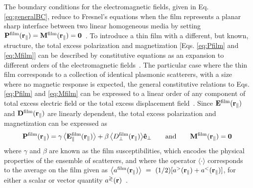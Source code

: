The boundary conditions for the electromagnetic fields, given in Eq. \eqref{eq:generalBC}, reduce to Fresnel’s equations when the film represents a planar sharp interface between two linear homogeneous media by setting $\vb{P}^\text{film}(\vb{r}_\parallel) = \vb{M}^\text{film}(\vb{r}_\parallel) = \vb{0}$~\cite{bedeaux_optical_2004}. To introduce a thin film with a different, but known, structure, the total excess polarization and magnetization [Eqs. \eqref{eq:Pfilm} and \eqref{eq:Mfilm}] can be described by constitutive equations as an expansion to different orders of the electromagnetic fields~\cite{bedeaux_optical_2004}. The particular case where the thin film corresponds to a collection of identical plasmonic scatterers, with a size where no magnetic response is expected, the general constitutive relations to Eqs.  \eqref{eq:Pfilm} and \eqref{eq:Mfilm}  can be expressed to a linear order of any component of total excess electric field or the total excess displacement field~\cite{lazzari_granfilm_2002,haarmans_optical_1995}. Since $\vb{E}^\text{film}(\vb{r}_\parallel)$ and $\vb{D}^\text{film}(\vb{r}_\parallel)$ are linearly dependent, the total excess polarization and magnetization can be expressed as~\cite{bedeaux_optical_2004,lazzari_granfilm_2002}
%
\begin{align}
	\vb{P}^\text{film}(\vb{r}_\parallel) = 
			\gamma\,\big\langle\vb{E}^\text{film}_\parallel(\vb{r}_\parallel)\big\rangle +
			\beta \,\big\langle {D}^\text{film}_\perp(\vb{r}_\parallel)\big\rangle \vu{e}_\perp
	\qquad\text{and}\qquad
	\vb{M}^\text{film}(\vb{r}_\parallel) = \vb{0}
\label{eq:P-TFT}
\end{align}
%
where $\gamma$ and $\beta$ are known as the film susceptibilities, which encodes the physical properties of the ensemble of scatterers, and where the operator $\langle\cdot\rangle$ corresponds to the average on the film given as $\big\langle a^\text{film} (\vb{r}_\parallel)\big\rangle~=~(1/2)[a^>(\vb{r}_\parallel) + a^<(\vb{r}_\parallel)]$, for either a scalar or vector quantity $a^\gtrless(\vb{r})$~\cite{lazzari_granfilm_2002,bedeaux_optical_2004}.


